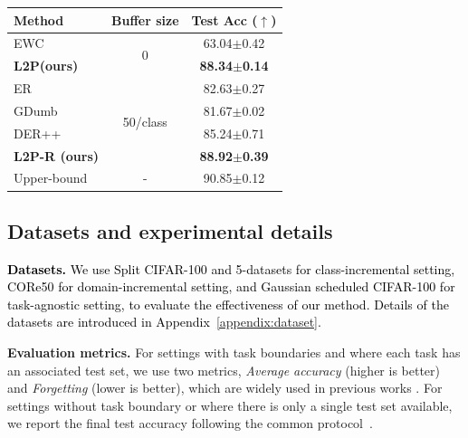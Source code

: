 \documentclass[10pt,twocolumn,letterpaper]{article}
\newcommand{\cam}[1]{\textcolor{black}{#1}}
\newcommand{\methodabbr}{L2P\xspace}
\begin{document}
\begin{table}
\small
{}
\vspace{-.2cm}
\label{table:task-agnostic}
\centering
\begin{tabular}{l||c|c}
\toprule 
 \textbf{Method} &\textbf{Buffer size}& Test Acc ($\uparrow$)  \\
\midrule
EWC~\cite{kirkpatrick2017overcoming} & \multirow{2}{*}{0} & 63.04\scriptsize{$\pm$0.42} \\
\textbf{\methodabbr (ours)} && \bf{88.34\scriptsize{$\pm$0.14}} \\
\midrule
ER~\cite{chaudhry2019tiny} &\multirow{4}{*}{50/class}& 82.63\scriptsize{$\pm$0.27}  \\
GDumb~\cite{prabhu2020gdumb} && 81.67\scriptsize{$\pm$0.02} \\
DER++~\cite{buzzega2020dark} && 85.24\scriptsize{$\pm$0.71} \\
\textbf{\methodabbr-R (ours)} && \bf{88.92\scriptsize{$\pm$0.39}} \\
\midrule
Upper-bound &-& 90.85\scriptsize{$\pm$0.12} \\
\bottomrule
\end{tabular}
\vspace{-.3cm}
\end{table}



\subsection{Datasets and experimental details}

\cam{
\textbf{Datasets.} We use Split CIFAR-100 \cite{krizhevsky2009learning} and 5-datasets \cite{ebrahimi2020adversarial} for class-incremental setting, CORe50 \cite{lomonaco2017core50} for domain-incremental setting, and Gaussian scheduled CIFAR-100 \cite{shanahan2021encoders} for task-agnostic setting, to evaluate the effectiveness of our method. Details of the datasets are introduced in Appendix~\ref{appendix:dataset}.
}








\textbf{Evaluation metrics.} For settings with task boundaries and where each task has an associated test set, we use two metrics, \emph{Average accuracy} (higher is better) and \emph{Forgetting} (lower is better), which are widely used in previous works \cite{lopez2017gradient, chaudhry2018efficient, mai2021online}. 
For settings without task boundary or where there is only a single test set available, we report the final test accuracy following the common protocol~\cite{lomonaco2017core50, shanahan2021encoders}.
\end{document}
